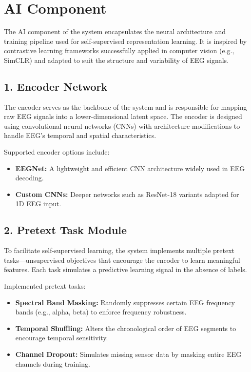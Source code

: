 \section{AI Component}
\label{sec:ai-component}

The AI component of the system encapsulates the neural architecture and training pipeline used for self-supervised representation learning. It is inspired by contrastive learning frameworks successfully applied in computer vision (e.g., SimCLR) and adapted to suit the structure and variability of EEG signals.

\subsection*{1. Encoder Network}

The encoder serves as the backbone of the system and is responsible for mapping raw EEG signals into a lower-dimensional latent space. The encoder is designed using convolutional neural networks (CNNs) with architecture modifications to handle EEG's temporal and spatial characteristics.

Supported encoder options include:
\begin{itemize}
    \item \textbf{EEGNet:} A lightweight and efficient CNN architecture widely used in EEG decoding.
    \item \textbf{Custom CNNs:} Deeper networks such as ResNet-18 variants adapted for 1D EEG input.
\end{itemize}

\subsection*{2. Pretext Task Module}

To facilitate self-supervised learning, the system implements multiple pretext tasks—unsupervised objectives that encourage the encoder to learn meaningful features. Each task simulates a predictive learning signal in the absence of labels.

Implemented pretext tasks:
\begin{itemize}
    \item \textbf{Spectral Band Masking:} Randomly suppresses certain EEG frequency bands (e.g., alpha, beta) to enforce frequency robustness.
    \item \textbf{Temporal Shuffling:} Alters the chronological order of EEG segments to encourage temporal sensitivity.
    \item \textbf{Channel Dropout:} Simulates missing sensor data by masking entire EEG channels during training.
\end{itemize}

